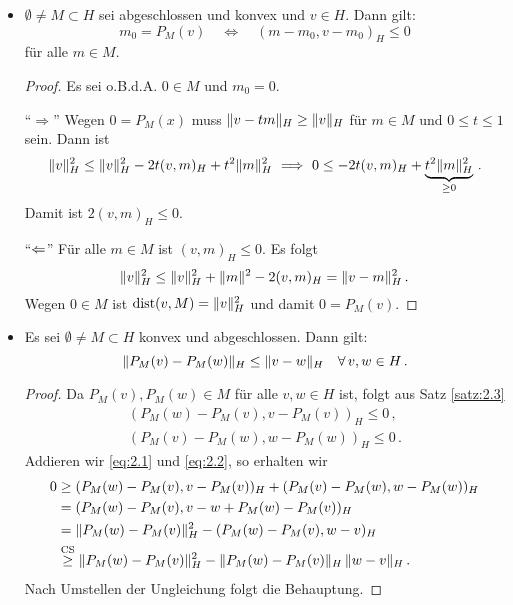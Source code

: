 \begin{itemize}
\item \begin{satz}\label{satz:2.3}
$\emptyset\neq M\subset H$ sei abgeschlossen und konvex und $v\in H$. Dann gilt:
\[ 
  	m_0=P_M(v)\quad\Longleftrightarrow\quad (m-m_0, v-m_0)_H\leq0 
\]
für alle $m\in M$.
\end{satz}

\begin{proof}
 Es sei o.B.d.A. $0\in M$ und $m_0=0$.
 
  "`$\Rightarrow$"' Wegen $0=P_M(x)$ muss $\lVert v-tm\rVert_H\geq\lVert v\rVert_H$ für $m\in M$ und $0\leq t\leq1$ sein. Dann ist
\begin{align*}
    	 \lVert v\rVert^2_H\leq\lVert v\rVert^2_H-2t(v, m)_H+t^2\lVert m\rVert^2_H
	\ \Longrightarrow \ 0 \le - 2t (v,m)_H + \underbrace{t^2 \lVert m\rVert_H^2}_{\ge 0} \, .
 \end{align*}
Damit ist $2(v, m)_H\leq0$.
 
 "`$\Leftarrow$"' Für alle $m\in M$ ist $(v, m)_H\leq0$. Es folgt
\[ 
	\lVert v\rVert^2_H\leq\lVert v\rVert^2_H+\lVert m\rVert^2-2(v,m)_H=\lVert v-m\rVert^2_H\, . 
\]
Wegen $0\in M$ ist $\operatorname{dist}(v,M)=\lVert v\rVert^2_H$ und damit $0=P_M(v)$.
\end{proof}

\item \begin{satz}\label{satz:2.4}
Es sei $\emptyset \not = M \subset H$ konvex und abgeschlossen. Dann gilt:
\[
	\lVert P_M(v)-P_M(w)\rVert_H \le \lVert v-w\rVert_H \quad \forall \, v,w \in H \, .
\]
\end{satz}

\begin{proof}
Da $P_M(v), P_M(w) \in M$ für alle $v,w \in H$ ist, folgt aus Satz \ref{satz:2.3}
\begin{align}\label{eq:2.1}
	(P_M(w)-P_M(v),v-P_M(v))_H  \le 0 \, , \\
	(P_M(v)-P_M(w),w-P_M(w))_H \le 0 \, .\label{eq:2.2}
\end{align}
Addieren wir \eqref{eq:2.1} und \eqref{eq:2.2}, so erhalten wir
\begin{align*}
	0 &\ge (P_M(w)-P_M(v),v-P_M(v))_H + (P_M(v)-P_M(w),w-P_M(w))_H \\
	& = (P_M(w)-P_M(v),v-w+P_M(w)-P_M(v))_H \\
	& = \lVert P_M(w)-P_M(v)\rVert_H^2-(P_M(w)-P_M(v),w-v)_H \\
	&\stackrel{\scriptsize \text{CS}}\ge \lVert P_M(w)-P_M(v)\rVert_H^2 - \lVert P_M(w)-P_M(v)\rVert_H \, \lVert w-v\rVert_H \, .
\end{align*}
Nach Umstellen der Ungleichung folgt die Behauptung.
\end{proof}


\end{itemize}
